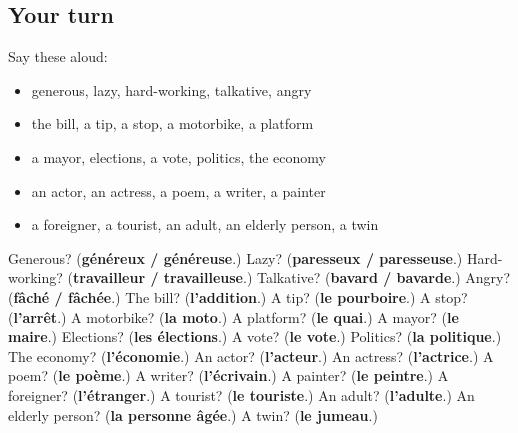\subsection*{Your turn}
Say these aloud:

\begin{itemize}
\raggedright
  \item generous, lazy, hard-working, talkative, angry
  \item the bill, a tip, a stop, a motorbike, a platform
  \item a mayor, elections, a vote, politics, the economy
  \item an actor, an actress, a poem, a writer, a painter
  \item a foreigner, a tourist, an adult, an elderly person, a twin
\end{itemize}

\begin{tcolorbox}[breakable,colback=teal!4,colframe=teal!35!black,title={Before you move on}]
Generous? (\textbf{généreux / généreuse}.) Lazy? (\textbf{paresseux / paresseuse}.) Hard-working? (\textbf{travailleur / travailleuse}.) Talkative? (\textbf{bavard / bavarde}.) Angry? (\textbf{fâché / fâchée}.) The bill? (\textbf{l'addition}.) A tip? (\textbf{le pourboire}.) A stop? (\textbf{l'arrêt}.) A motorbike? (\textbf{la moto}.) A platform? (\textbf{le quai}.) A mayor? (\textbf{le maire}.) Elections? (\textbf{les élections}.) A vote? (\textbf{le vote}.) Politics? (\textbf{la politique}.) The economy? (\textbf{l'économie}.) An actor? (\textbf{l'acteur}.) An actress? (\textbf{l'actrice}.) A poem? (\textbf{le poème}.) A writer? (\textbf{l'écrivain}.) A painter? (\textbf{le peintre}.) A foreigner? (\textbf{l'étranger}.) A tourist? (\textbf{le touriste}.) An adult? (\textbf{l'adulte}.) An elderly person? (\textbf{la personne âgée}.) A twin? (\textbf{le jumeau}.)
\end{tcolorbox}
